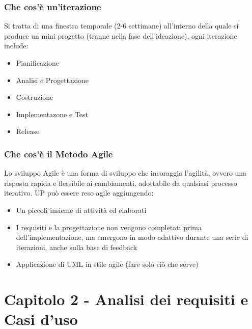 \documentclass[12pt, a4paper, openany]{book}
\begin{document}
\subsection*{Che cos'è un'iterazione}
Si tratta di una finestra temporale (2-6 settimane) all'interno della quale si produce
un mini progetto (tranne nella fase dell'ideazione), ogni iterazione include:
\begin{itemize}
    \item Pianificazione
    \item Analisi e Progettazione
    \item Costruzione
    \item Implementazone e Test
    \item Release
\end{itemize}
\subsection*{Che cos'è il Metodo Agile}
Lo sviluppo Agile è una forma di sviluppo che incoraggia l'agilità, ovvero una risposta
rapida e flessibile ai cambiamenti, adottabile da qualsiasi processo iterativo. UP
può essere reso agile aggiungendo:
\begin{itemize}
    \item Un piccoli insieme di attività ed elaborati
    \item I requisiti e la progettazione non vengono completati prima dell'implementazione, ma
    emergono in modo adattivo durante una serie di iterazioni, anche sulla base di feedback
    \item Applicazione di UML in stile agile (fare solo ciò che serve)
\end{itemize}

\chapter{Capitolo 2 - Analisi dei requisiti e Casi d'uso}
\end{document}
